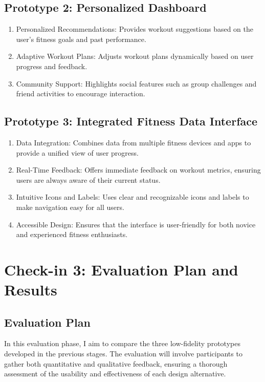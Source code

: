 \documentclass[
	letterpaper, %
]{jdf}
\begin{document}
\subsection{Prototype 2: Personalized Dashboard}
\begin{enumerate}
        \item Personalized Recommendations: Provides workout suggestions based on the user's fitness goals and past performance.
        \item Adaptive Workout Plans: Adjusts workout plans dynamically based on user progress and feedback.
        \item Community Support: Highlights social features such as group challenges and friend activities to encourage interaction.
\end{enumerate}

\subsection{Prototype 3: Integrated Fitness Data Interface}
\begin{enumerate}
        \item Data Integration: Combines data from multiple fitness devices and apps to provide a unified view of user progress.
        \item Real-Time Feedback: Offers immediate feedback on workout metrics, ensuring users are always aware of their current status.
        \item Intuitive Icons and Labels: Uses clear and recognizable icons and labels to make navigation easy for all users.
        \item Accessible Design: Ensures that the interface is user-friendly for both novice and experienced fitness enthusiasts.
\end{enumerate}

\newpage

\section{Check-in 3: Evaluation Plan and Results}
\subsection{Evaluation Plan}
In this evaluation phase, I aim to compare the three low-fidelity prototypes developed in the previous stages. The evaluation will involve participants to gather both quantitative and qualitative feedback, ensuring a thorough assessment of the usability and effectiveness of each design alternative.
\end{document}

